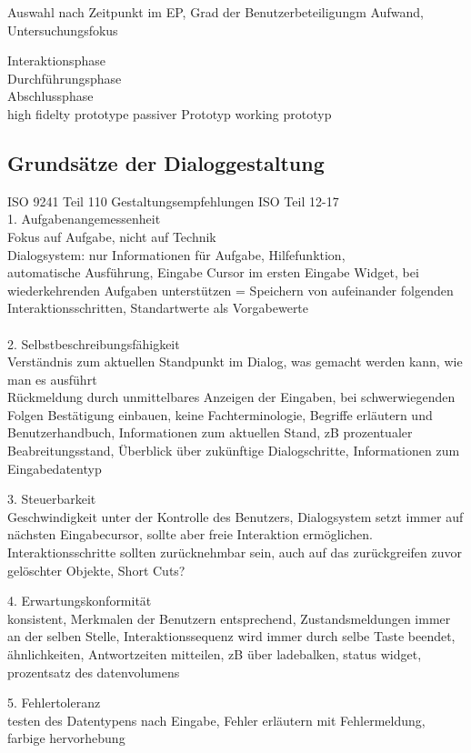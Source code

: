 Auswahl nach Zeitpunkt im EP, Grad der Benutzerbeteiligungm Aufwand, Untersuchungsfokus

Interaktionsphase\\
Durchführungsphase\\
Abschlussphase\\
high fidelty prototype
passiver Prototyp
working prototyp 

\subsection{Grundsätze der Dialoggestaltung}
 ISO 9241 Teil 110
 Gestaltungsempfehlungen ISO Teil 12-17
\\
 1. Aufgabenangemessenheit\\
 	Fokus auf Aufgabe, nicht auf Technik\\
 	Dialogsystem: nur Informationen für Aufgabe, Hilfefunktion, \\automatische Ausführung, Eingabe Cursor im ersten Eingabe Widget, bei wiederkehrenden Aufgaben unterstützen = Speichern von aufeinander folgenden Interaktionsschritten, Standartwerte als Vorgabewerte\\
\\
 2. Selbstbeschreibungsfähigkeit\\
    Verständnis zum aktuellen Standpunkt im Dialog, was gemacht werden kann, wie man es ausführt\\
    Rückmeldung durch unmittelbares Anzeigen der Eingaben, bei schwerwiegenden Folgen Bestätigung einbauen, keine Fachterminologie, Begriffe erläutern und Benutzerhandbuch, Informationen zum aktuellen Stand, zB prozentualer Beabreitungsstand, Überblick über zukünftige Dialogschritte, Informationen zum Eingabedatentyp

 3. Steuerbarkeit\\
 	Geschwindigkeit unter der Kontrolle des Benutzers, Dialogsystem setzt immer auf nächsten Eingabecursor, sollte aber freie Interaktion ermöglichen. Interaktionsschritte sollten zurücknehmbar sein, auch auf das zurückgreifen zuvor gelöschter Objekte, Short Cuts?

 4. Erwartungskonformität\\
 	konsistent, Merkmalen der Benutzern entsprechend, Zustandsmeldungen immer an der selben Stelle, Interaktionssequenz wird immer durch selbe Taste beendet, ähnlichkeiten, Antwortzeiten mitteilen, zB über ladebalken, status widget, prozentsatz des datenvolumens

 5. Fehlertoleranz\\
 	testen des Datentypens nach Eingabe, Fehler erläutern mit Fehlermeldung, farbige hervorhebung 

